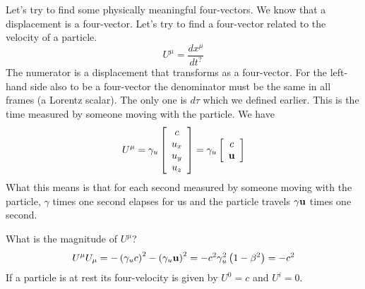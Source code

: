 Let's try to find some physically meaningful four-vectors.    We know
that a displacement is a four-vector.  Let's try to find a four-vector
related to the velocity of a particle.
\begin{equation}
U^\mu = \frac{d x^\mu}{d t^?}
\label{eq:289}
\end{equation}
The numerator is a displacement that transforms as a four-vector.  For
the left-hand side also to be a four-vector the denominator must be
the same in all frames (a Lorentz scalar).  The only one is $d\tau$
which we defined earlier.  This is the time measured by someone moving
with the particle.  We have
\begin{equation}
U^\mu = \gamma_u \left [ \begin{array}{c} c \\ u_x \\ u_y \\ u_z \end{array} 
    \right ] = \gamma_u \left [ \begin{array}{c} c \\ {\bf u}
  \end{array} \right ]
\label{eq:290}
\end{equation}
What this means is that for each second measured by someone moving
with the particle, $\gamma$ times one second elapses for us and the
particle travels $\gamma {\bf u}$ times one second.

What is the magnitude of $U^\mu$?   
\begin{equation}
U^\mu U_\mu = -\left (\gamma_u c\right)^2 - \left ( \gamma_u {\bf u}
\right )^2 = -c^2 \gamma_u^2 \left ( 1 - \beta^2 \right ) = -c^2 
\label{eq:291}
\end{equation}
If a particle is at rest its four-velocity is given by
$U^0=c$ and $U^i=0$.  

